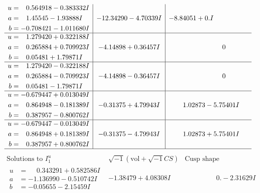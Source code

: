 \documentclass[1p]{elsarticle_modified}
\theoremstyle{definition}
\newcommand{\I}{\sqrt{-1}}
\begin{document}
$$\begin{array}{c|c|c}
\begin{aligned}
u &= \phantom{-}0.564918 - 0.383332 I \\
a &= \phantom{-}1.45545 - 1.93888 I \\
b &= -0.708421 - 1.011680 I\end{aligned}
 & -12.34290 - 4.70339 I & -8.84051 + 0. I\phantom{ +0.000000I} \\ \hline\begin{aligned}
u &= \phantom{-}1.279420 + 0.322188 I \\
a &= \phantom{-}0.265884 + 0.709923 I \\
b &= \phantom{-}0.05481 + 1.79871 I\end{aligned}
 & -4.14898 + 0.36457 I & \phantom{-0.000000 } 0 \\ \hline\begin{aligned}
u &= \phantom{-}1.279420 - 0.322188 I \\
a &= \phantom{-}0.265884 - 0.709923 I \\
b &= \phantom{-}0.05481 - 1.79871 I\end{aligned}
 & -4.14898 - 0.36457 I & \phantom{-0.000000 } 0 \\ \hline\begin{aligned}
u &= -0.679447 + 0.013049 I \\
a &= \phantom{-}0.864948 - 0.181389 I \\
b &= \phantom{-}0.387957 - 0.800762 I\end{aligned}
 & -0.31375 + 4.79943 I & \phantom{-}1.02873 - 5.75401 I \\ \hline\begin{aligned}
u &= -0.679447 - 0.013049 I \\
a &= \phantom{-}0.864948 + 0.181389 I \\
b &= \phantom{-}0.387957 + 0.800762 I\end{aligned}
 & -0.31375 - 4.79943 I & \phantom{-}1.02873 + 5.75401 I\\
 \hline 
 \end{array}$$\newpage$$\begin{array}{c|c|c}  
\text{Solutions to }I^u_{1}& \I (\text{vol} + \sqrt{-1}CS) & \text{Cusp shape}\\
 \hline 
\begin{aligned}
u &= \phantom{-}0.343291 + 0.582586 I \\
a &= -1.136990 - 0.510742 I \\
b &= -0.05655 - 2.15459 I\end{aligned}
 & -1.38479 + 4.08308 I & \phantom{-0.000000 } 0. - 2.31629 I \\ \hline\begin{aligned}

\end{aligned}
\end{array}$$
\end{document}

